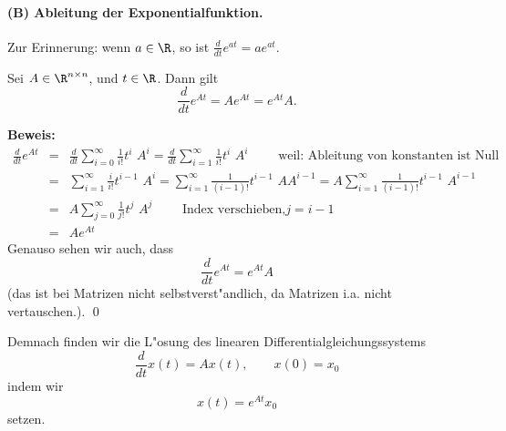 \paragraph{(B) Ableitung der Exponentialfunktion.} Zur Erinnerung:  
wenn $a\in\R$, so ist $\frac d {dt} e^{at} = a e^{at}$.
\begin{slemma}  Sei $A\in \R^{n\times n}$, und $t\in\R$. Dann gilt
$$ \frac d {dt} e^{At} = A e^{At} = e^{At}A.$$
\end{slemma}
{\bf Beweis: } 
\begin{eqnarray*}
\frac d {dt} e^{At} 
& = &  \frac d {dt}\sum_{i=0}^\infty \frac 1 {i!} t ^i \,\, A^i  =  \frac d {dt} \sum_{i=1}^\infty \frac 1 {i!} t ^i \,\, A^i\qquad\mbox{ 
weil: Ableitung von konstanten ist Null}\\
& = & \sum_{i=1}^\infty \frac i {i!} t^{i-1} \,\, A^i =  \sum_{i=1}^\infty \frac 1 {(i-1)!} t^{i-1} \,\, A A^{i-1} =  A \sum_{i=1}^\infty \frac 1 {(i-1)!} t^{i-1} \,\, A^{i-1}\\
& = & A \sum_{j=0}^\infty \frac 1 {j!} t^{j} \,\, A^{j}\qquad\mbox{ Index verschieben,}j=i-1\\
& = &  A e^{At}
\end{eqnarray*}
Genauso sehen wir auch, dass
$$ \frac d {dt} e^{At} 
 =    e^{At} A$$
(das ist bei Matrizen nicht selbstverst"andlich, da Matrizen i.a. nicht vertauschen.). \qed
\begin{sbem}
Demnach  finden wir die L"osung des linearen Differentialgleichungssystems
$$ \frac d {dt}x(t) = Ax(t),\qquad x(0) = x_0$$
indem wir
$$ x(t) = e^{A t}x_0$$
setzen.
\end{sbem} 
